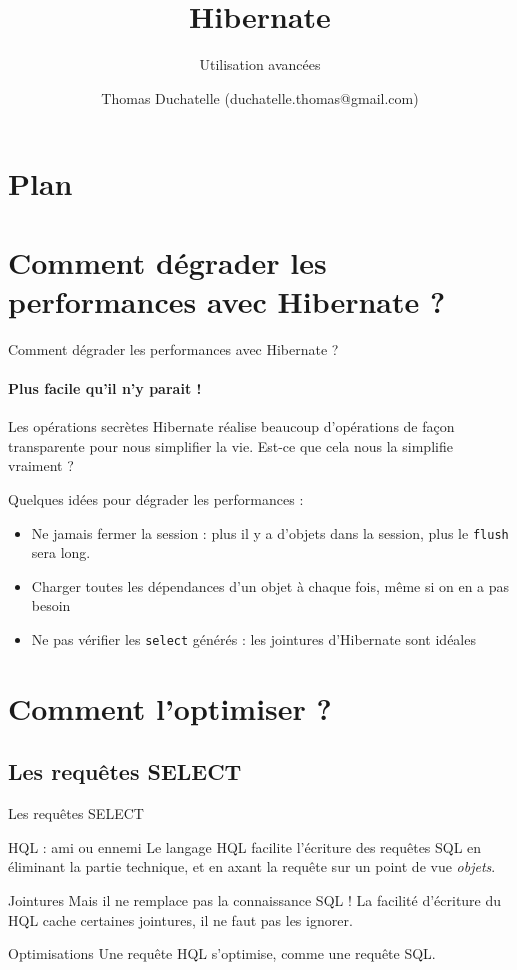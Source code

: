 \documentclass[compress]{beamer}%
\title{Hibernate}
\subtitle{Utilisation avancées}
\author{Thomas Duchatelle (duchatelle.thomas@gmail.com)}
\institute{Capgemini, pour Yves Rocher}
\begin{document}
\frame{\titlepage}
  
\section*{Plan}
\frame{\tableofcontents[hideallsubsections]}
	
\section{Comment dégrader les performances avec Hibernate ?}

\begin{frame}{Comment dégrader les performances avec Hibernate ?}
	\framesubtitle{Plus facile qu'il n'y parait !}
	
	\begin{block}{Les opérations secrètes}
	Hibernate réalise beaucoup d'opérations de façon transparente pour nous simplifier la vie. Est-ce que cela nous la simplifie vraiment ?
	\end{block}		
	
	\pause
	Quelques idées pour dégrader les performances : 
	\begin{itemize}[<+->]
	\item Ne jamais fermer la session : plus il y a d'objets dans la session, plus le \texttt{flush} sera long.
	\item Charger toutes les dépendances d'un objet à chaque fois, même si on en a pas besoin
	\item Ne pas vérifier les \texttt{select} générés : les jointures d'Hibernate sont idéales
	\end{itemize}
\end{frame}


\section{Comment l'optimiser ?}

\subsection{Les requêtes SELECT}
\begin{frame}{Les requêtes SELECT}
	
	\begin{block}{HQL : ami ou ennemi}
	Le langage HQL facilite l'écriture des requêtes SQL en éliminant la partie technique, et en axant la requête sur un point de vue \emph{objets}.
	\end{block}
	
	\pause
	\begin{alertblock}{Jointures}
	Mais il ne remplace pas la connaissance SQL ! La facilité d'écriture du HQL cache certaines jointures, il ne faut pas les ignorer.
	\end{alertblock}
	
	\pause
	\begin{block}{Optimisations}
	Une requête HQL s'optimise, comme une requête SQL.
	\end{block}
\end{frame}
\end{document}
